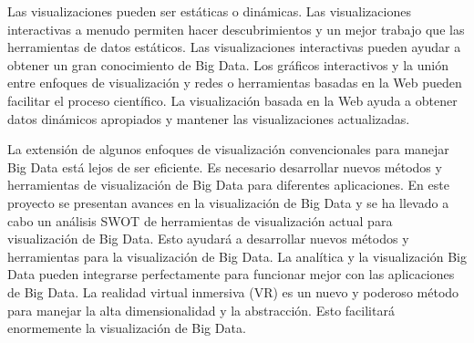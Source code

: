 Las visualizaciones pueden ser estáticas o dinámicas. Las visualizaciones interactivas a menudo permiten hacer descubrimientos y un mejor trabajo que las herramientas de datos estáticos. Las visualizaciones interactivas pueden ayudar a obtener un gran conocimiento de Big Data. Los gráficos interactivos y la unión entre enfoques de visualización y redes o herramientas basadas en la Web pueden facilitar el proceso científico. La visualización basada en la Web ayuda a obtener datos dinámicos apropiados y mantener las visualizaciones actualizadas.

La extensión de algunos enfoques de visualización convencionales para manejar Big Data está lejos de ser eficiente. Es necesario desarrollar nuevos métodos y herramientas de visualización de Big Data para diferentes aplicaciones. En este proyecto se presentan avances en la visualización de Big Data y se ha llevado a cabo un análisis SWOT de herramientas de visualización actual para visualización de Big Data. Esto ayudará a desarrollar nuevos métodos y herramientas para la visualización de Big Data. La analítica y la visualización Big Data pueden integrarse perfectamente para funcionar mejor con las aplicaciones de Big Data. La realidad virtual inmersiva (VR) es un nuevo y poderoso método para manejar la alta dimensionalidad y la abstracción. Esto facilitará enormemente la visualización de Big Data.


